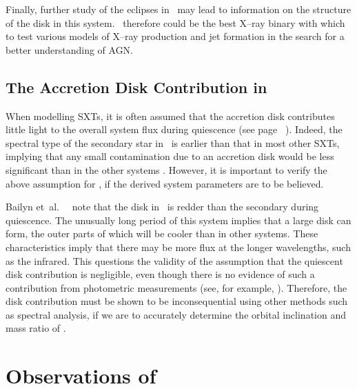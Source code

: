 Finally, further study of the eclipses in \groj\ may lead to information on the
structure of the disk in this system. \groj\ therefore could be the best X--ray binary with which to test
various models of X--ray production and jet formation in the search for
a better understanding of AGN. %


\subsection{The Accretion Disk Contribution in \groj}\label{cha:GROJ1655-40:sec:IntroductionToJ1655:subsec:TheAccretionDisk}

When modelling SXTs, it is often assumed that the accretion disk
contributes little light to the overall system flux during
quiescence (see page~%
\pageref{cha:InfraredDataReductionTechniques:sec:InfraredAstronomy:subsubsec:InfraredSpectroscopy}%
). Indeed, the spectral type of the secondary star in \groj\ is earlier than that in most other SXTs, implying that any small
contamination due to an accretion disk would be less significant than
in the other systems %
\cite{BeerPodsiadlowski:2001}%
. However, it is important to verify the above assumption for \groj, if the derived
system parameters are to be believed. %

\vspace{\myparskip}

Bailyn et~al.\ %
\citeyear{BailynJain_et_al.:1998}%
\ note that the disk in \groj\ is redder than the secondary during
quiescence. The unusually long period of this system implies that a
large disk can form, the outer parts of which will be cooler than in
other systems. These characteristics imply that there may
be more flux at the longer wavelengths, such as the infrared. This questions the validity of the
assumption that the quiescent disk contribution is negligible, even though there is no evidence of such a contribution from photometric measurements (see, for example, %
%
). Therefore, the
disk contribution must be shown to be inconsequential using other
methods such as spectral analysis, if we are to accurately determine
the orbital inclination and mass ratio of \groj. %


\section{Observations of \groj}\label{cha:GROJ1655-40:sec:ObservationsOfJ1655}

